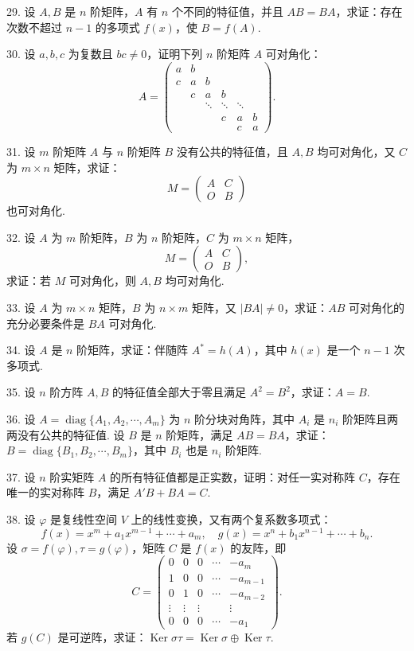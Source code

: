 \documentclass[UTF8,12pt,a4paper,fontset=fandol]{ctexart}
\begin{document}
29. 设 $A,B$ 是 $n$ 阶矩阵，$A$ 有 $n$ 个不同的特征值，并且 $AB=BA$，求证：存在次数不超过 $n-1$ 的多项式 $f(x)$，使 $B=f(A)$.

30. 设 $a,b,c$ 为复数且 $bc\neq 0$，证明下列 $n$ 阶矩阵 $A$ 可对角化：
\[
A=\left(\begin{array}{cccccc}
a & b & & & & \\
c & a & b & & & \\
& c & a & b & & \\
& & \ddots & \ddots & \ddots & \\
& & & c & a & b\\
& & & & c & a
\end{array}\right).
\]

31. 设 $m$ 阶矩阵 $A$ 与 $n$ 阶矩阵 $B$ 没有公共的特征值，且 $A,B$ 均可对角化，又 $C$ 为 $m\times n$ 矩阵，求证：
\[
M=\left(\begin{array}{cc}
A & C\\
O & B
\end{array}\right)
\]
也可对角化.

32. 设 $A$ 为 $m$ 阶矩阵，$B$ 为 $n$ 阶矩阵，$C$ 为 $m\times n$ 矩阵，
\[
M=\left(\begin{array}{cc}
A & C\\
O & B
\end{array}\right),
\]
求证：若 $M$ 可对角化，则 $A,B$ 均可对角化.

33. 设 $A$ 为 $m\times n$ 矩阵，$B$ 为 $n\times m$ 矩阵，又 $|BA|\neq 0$，求证：$AB$ 可对角化的充分必要条件是 $BA$ 可对角化.

34. 设 $A$ 是 $n$ 阶矩阵，求证：伴随阵 $A^*=h(A)$，其中 $h(x)$ 是一个 $n-1$ 次多项式.

35. 设 $n$ 阶方阵 $A,B$ 的特征值全部大于零且满足 $A^2=B^2$，求证：$A=B$.

36. 设 $A=\operatorname{diag}\{A_1,A_2,\cdots,A_m\}$ 为 $n$ 阶分块对角阵，其中 $A_i$ 是 $n_i$ 阶矩阵且两两没有公共的特征值. 设 $B$ 是 $n$ 阶矩阵，满足 $AB=BA$，求证：$B=\operatorname{diag}\{B_1,B_2,\cdots,B_m\}$，其中 $B_i$ 也是 $n_i$ 阶矩阵.

37. 设 $n$ 阶实矩阵 $A$ 的所有特征值都是正实数，证明：对任一实对称阵 $C$，存在唯一的实对称阵 $B$，满足 $A'B+BA=C$.

38. 设 $\varphi$ 是复线性空间 $V$ 上的线性变换，又有两个复系数多项式：
\[
f(x)=x^m+a_1x^{m-1}+\cdots+a_m,\quad g(x)=x^n+b_1x^{n-1}+\cdots+b_n.
\]
设 $\sigma=f(\varphi),\tau=g(\varphi)$，矩阵 $C$ 是 $f(x)$ 的友阵，即
\[
C=\left(\begin{array}{ccccc}
0 & 0 & 0 & \cdots & -a_m\\
1 & 0 & 0 & \cdots & -a_{m-1}\\
0 & 1 & 0 & \cdots & -a_{m-2}\\
\vdots & \vdots & \vdots & & \vdots\\
0 & 0 & 0 & \cdots & -a_1
\end{array}\right).
\]
若 $g(C)$ 是可逆阵，求证：$\operatorname{Ker}\sigma\tau=\operatorname{Ker}\sigma\oplus\operatorname{Ker}\tau$.
\end{document}
